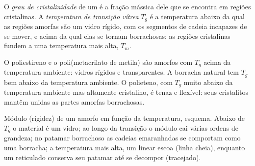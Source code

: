 \begin{definition}\label{def:b2:polymer-synthesis:transitions}
O \emph{grau de cristalinidade} de um  é a fração mássica dele que se encontra
em regiões cristalinas. A \emph{temperatura de transição vítrea}
$T_g$ é a temperatura abaixo da qual as regiões amorfas são um vidro rígido, com os segmentos de cadeia
incapazes de se mover, e acima da qual elas se tornam borrachosas; as regiões cristalinas fundem a uma
temperatura mais alta, $T_m$.
\end{definition}

O poliestireno e o poli(metacrilato de metila) são amorfos com $T_g$ acima da temperatura ambiente:
vidros rígidos e transparentes. A borracha natural tem $T_g$ bem abaixo da temperatura ambiente. O
polieteno, com $T_g$ muito abaixo da temperatura ambiente mas altamente cristalino, é tenaz e flexível:
seus cristalitos mantêm unidas as partes amorfas borrachosas.

\begin{omfigure}
\par\vspace{4pt}

{\small Módulo (rigidez) de um  amorfo em função da temperatura, esquema. Abaixo de $T_g$ o
material é um vidro; ao longo da transição o módulo cai várias ordens de grandeza; no patamar
borrachoso as cadeias emaranhadas se comportam como uma borracha; a temperatura mais alta, um 
linear escoa (linha cheia), enquanto um reticulado conserva seu patamar até se decompor (tracejado).}
\end{omfigure}

